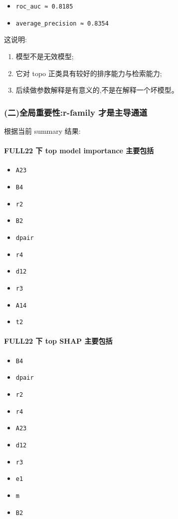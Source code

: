 \documentclass[lang=cn,scheme=chinese,color=blue,device=normal,toc=onecol,math=cm]{elegantbook}
\begin{document}
\begin{itemize}
\item \texttt{roc\_\allowbreak{}auc ≈ 0.8185}
\item \texttt{average\_\allowbreak{}precision ≈ 0.8354}
\end{itemize}


这说明:\par


\begin{enumerate}
\item 模型不是无效模型;
\item 它对 topo 正类具有较好的排序能力与检索能力;
\item 后续做参数解释是有意义的,不是在解释一个坏模型。
\end{enumerate}


\subsubsection{(二)全局重要性:r-family 才是主导通道}


根据当前 summary 结果:\par


\paragraph{FULL22 下 top model importance 主要包括}


\begin{itemize}
\item \texttt{A23}
\item \texttt{B4}
\item \texttt{r2}
\item \texttt{B2}
\item \texttt{dpair}
\item \texttt{r4}
\item \texttt{d12}
\item \texttt{r3}
\item \texttt{A14}
\item \texttt{t2}
\end{itemize}


\paragraph{FULL22 下 top SHAP 主要包括}


\begin{itemize}
\item \texttt{B4}
\item \texttt{dpair}
\item \texttt{r2}
\item \texttt{r4}
\item \texttt{A23}
\item \texttt{d12}
\item \texttt{r3}
\item \texttt{e1}
\item \texttt{m}
\item \texttt{B2}
\end{itemize}
\end{document}
